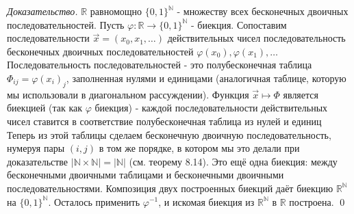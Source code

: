 \documentclass[a4paper]{article}
\begin{document}
\textit{Доказательство.} $\mathbb{R}$ равномощно $\{0,1\}^{\mathbb{N}}$ - множеству всех бесконечных двоичных последовательностей. Пусть $\varphi: \mathbb{R} \rightarrow\{0,1\}^{\mathbb{N}}$ - биекция. Сопоставим последовательности $\vec{x}=\left(x_{0}, x_{1}, \ldots\right)$ действительных чисел последовательность бесконечных двоичных последовательностей $\varphi\left(x_{0}\right), \varphi\left(x_{1}\right), \ldots$\\[2mm]
 Последовательность последовательностей - это полубесконечная таблица $\Phi_{i j}=\varphi\left(x_{i}\right)_{j}$, заполненная нулями и единицами (аналогичная таблице, которую мы использовали в диагональном рассуждении). Функция $\vec{x} \mapsto \Phi$ является биекцией (так как $\varphi$ биекция) - каждой последовательности действительных чисел ставится в соответствие полубесконечная таблица из нулей и единиц\\[2mm]
 Теперь из этой таблицы сделаем бесконечную двоичную последовательность, нумеруя пары $(i, j)$ в том же порядке, в котором мы это делали при доказательстве $|\mathbb{N} \times \mathbb{N}|=|\mathbb{N}|$ (см. теорему 8.14). Это ещё одна биекция: между бесконечными двоичными таблицами и бесконечными двоичными последовательностями. Композиция двух построенных биекций даёт биекцию $\mathbb{R}^{\mathbb{N}}$ на $\{0,1\}^{\mathbb{N}}$. Осталось применить $\varphi^{-1}$, и искомая биекция из $\mathbb{R}^{\mathbb{N}}$ в $\mathbb{R}$ построена. \qed
\end{document}
